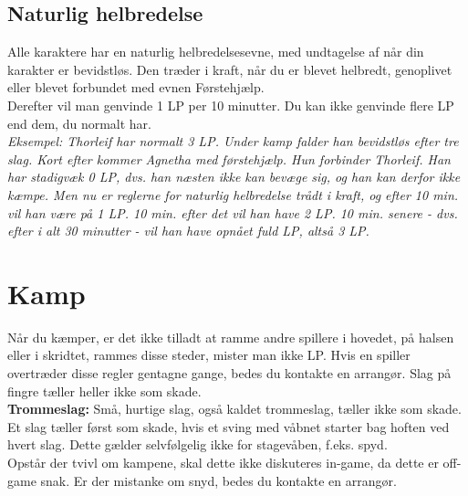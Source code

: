 \subsection*{Naturlig helbredelse}
Alle karaktere har en naturlig helbredelsesevne, med undtagelse af når din karakter er bevidstløs. Den træder i kraft, når du er blevet helbredt, genoplivet eller blevet forbundet med evnen Førstehjælp.\\
Derefter vil man genvinde 1 LP per 10 minutter. Du kan ikke genvinde flere LP end dem, du normalt har.\\
\textit{Eksempel: Thorleif har normalt 3 LP. Under kamp falder han bevidstløs efter tre slag. Kort efter kommer Agnetha med førstehjælp. Hun forbinder Thorleif. Han har stadigvæk 0 LP, dvs. han næsten ikke kan bevæge sig, og han kan derfor ikke kæmpe. Men nu er reglerne for naturlig helbredelse trådt i kraft, og efter 10 min. vil han være på 1 LP. 10 min. efter det vil han have 2 LP. 10 min. senere - dvs. efter i alt 30 minutter - vil han have opnået fuld LP, altså 3 LP.}

\section*{Kamp}
Når du kæmper, er det ikke tilladt at ramme andre spillere i hovedet, på halsen eller i skridtet, rammes disse steder, mister man ikke LP. Hvis en spiller overtræder disse regler gentagne gange, bedes du kontakte en arrangør. Slag på fingre tæller heller ikke som skade.\\
\textbf{Trommeslag:} Små, hurtige slag, også kaldet trommeslag, tæller ikke som skade. Et slag tæller først som skade, hvis et sving med våbnet starter bag hoften ved hvert slag. Dette gælder selvfølgelig ikke for stagevåben, f.eks. spyd.\\
Opstår der tvivl om kampene, skal dette ikke diskuteres in-game, da dette er off-game snak. Er der mistanke om snyd, bedes du kontakte en arrangør.
